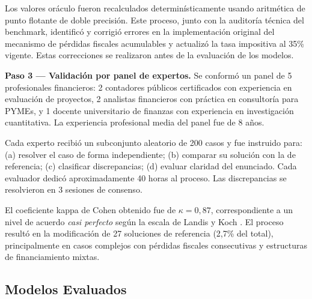 \documentclass[12pt,a4paper]{article}
\begin{document}
Los valores oráculo fueron recalculados determinísticamente usando aritmética de punto flotante de doble precisión. Este proceso, junto con la auditoría técnica del benchmark, identificó y corrigió errores en la implementación original del mecanismo de pérdidas fiscales acumulables y actualizó la tasa impositiva al 35\% vigente. Estas correcciones se realizaron antes de la evaluación de los modelos.

\textbf{Paso 3 --- Validación por panel de expertos.} Se conformó un panel de 5 profesionales financieros: 2 contadores públicos certificados con experiencia en evaluación de proyectos, 2 analistas financieros con práctica en consultoría para PYMEs, y 1 docente universitario de finanzas con experiencia en investigación cuantitativa. La experiencia profesional media del panel fue de 8 años.

Cada experto recibió un subconjunto aleatorio de 200 casos y fue instruido para: (a) resolver el caso de forma independiente; (b) comparar su solución con la de referencia; (c) clasificar discrepancias; (d) evaluar claridad del enunciado. Cada evaluador dedicó aproximadamente 40 horas al proceso. Las discrepancias se resolvieron en 3 sesiones de consenso.

El coeficiente kappa de Cohen \citep{Cohen1960, Artstein2008} obtenido fue de $\kappa = 0{,}87$, correspondiente a un nivel de acuerdo \textit{casi perfecto} según la escala de Landis y Koch \citeyear{LandisKoch1977}. El proceso resultó en la modificación de 27 soluciones de referencia (2,7\% del total), principalmente en casos complejos con pérdidas fiscales consecutivas y estructuras de financiamiento mixtas.

\subsection{Modelos Evaluados}
\end{document}
